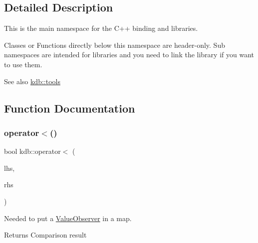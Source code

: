 \subsection{Detailed Description}
This is the main namespace for the C++ binding and libraries. 

Classes or Functions directly below this namespace are header-\/only. Sub namespaces are intended for libraries and you need to link the library if you want to use them.
\begin{DoxyItemize}
\item \begin{DoxySeeAlso}{See also}
\mbox{\hyperlink{namespacekdb_1_1tools}{kdb\+::tools}} 
\end{DoxySeeAlso}

\end{DoxyItemize}

\subsection{Function Documentation}
\mbox{\label{namespacekdb_a53a162c7ff73150a3f6e6ab9d191aab0}} 
\subsubsection{\texorpdfstring{operator$<$()}{operator<()}}
{\footnotesize\ttfamily bool kdb\+::operator$<$ (\begin{DoxyParamCaption}\item[{\mbox{\hyperlink{classkdb_1_1ValueObserver}{Value\+Observer}} const \&}]{lhs,  }\item[{\mbox{\hyperlink{classkdb_1_1ValueObserver}{Value\+Observer}} const \&}]{rhs }\end{DoxyParamCaption})\hspace{0.3cm}{\ttfamily [inline]}}



Needed to put a \mbox{\hyperlink{classkdb_1_1ValueObserver}{Value\+Observer}} in a map. 

\begin{DoxyReturn}{Returns}
Comparison result 
\end{DoxyReturn}
\mbox{\label{namespacekdb_ac004b5ba79154cbba02d5e5d83337e47}} 
